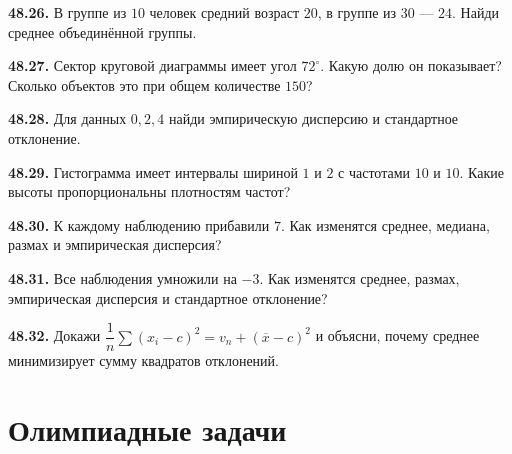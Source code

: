 \noindent\begin{minipage}[t]{\linewidth}\textbf{48.26.} В группе из \(10\) человек средний возраст \(20\), в группе из \(30\) --- \(24\). Найди среднее объединённой группы.\par\end{minipage}\par
\noindent\begin{minipage}[t]{\linewidth}\textbf{48.27.} Сектор круговой диаграммы имеет угол \(72^\circ\). Какую долю он показывает? Сколько объектов это при общем количестве \(150\)?\par\end{minipage}\par
\noindent\begin{minipage}[t]{\linewidth}\textbf{48.28.} Для данных \(0,2,4\) найди эмпирическую дисперсию и стандартное отклонение.\par\end{minipage}\par
\noindent\begin{minipage}[t]{\linewidth}\textbf{48.29.} Гистограмма имеет интервалы шириной \(1\) и \(2\) с частотами \(10\) и \(10\). Какие высоты пропорциональны плотностям частот?\par\end{minipage}\par
\noindent\begin{minipage}[t]{\linewidth}\textbf{48.30.}\starmark{} К каждому наблюдению прибавили \(7\). Как изменятся среднее, медиана, размах и эмпирическая дисперсия?\par\end{minipage}\par
\noindent\begin{minipage}[t]{\linewidth}\textbf{48.31.}\starmark{} Все наблюдения умножили на \(-3\). Как изменятся среднее, размах, эмпирическая дисперсия и стандартное отклонение?\par\end{minipage}\par
\noindent\begin{minipage}[t]{\linewidth}\textbf{48.32.}\starmark{} Докажи \(\dfrac1n\sum(x_i-c)^2=v_n+(\overline x-c)^2\) и объясни, почему среднее минимизирует сумму квадратов отклонений.\par\end{minipage}\par
\par{}\section*{Олимпиадные задачи}
